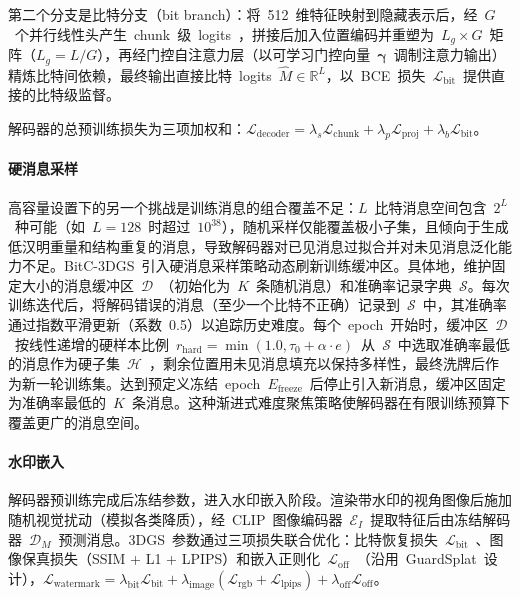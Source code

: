 第二个分支是比特分支（bit branch）：将~512~维特征映射到隐藏表示后，经~$G$~个并行线性头产生~chunk~级~logits~，拼接后加入位置编码并重塑为~$L_g \times G$~矩阵（$L_g = L/G$），再经门控自注意力层（以可学习门控向量~$\bm{\gamma}$~调制注意力输出）精炼比特间依赖，最终输出直接比特~logits~$\hat{M} \in \mathbb{R}^L$，以~BCE~损失~$\mathcal{L}_{\mathrm{bit}}$~提供直接的比特级监督。

解码器的总预训练损失为三项加权和：$\mathcal{L}_{\mathrm{decoder}} = \lambda_s \mathcal{L}_{\mathrm{chunk}} + \lambda_p \mathcal{L}_{\mathrm{proj}} + \lambda_b \mathcal{L}_{\mathrm{bit}}$。

\paragraph{硬消息采样}
高容量设置下的另一个挑战是训练消息的组合覆盖不足：$L$~比特消息空间包含~$2^L$~种可能（如~$L=128$~时超过~$10^{38}$），随机采样仅能覆盖极小子集，且倾向于生成低汉明重量和结构重复的消息，导致解码器对已见消息过拟合并对未见消息泛化能力不足。BitC-3DGS~引入硬消息采样策略动态刷新训练缓冲区。具体地，维护固定大小的消息缓冲区~$\mathcal{D}$~（初始化为~$K$~条随机消息）和准确率记录字典~$\mathcal{S}$。每次训练迭代后，将解码错误的消息（至少一个比特不正确）记录到~$\mathcal{S}$~中，其准确率通过指数平滑更新（系数~0.5）以追踪历史难度。每个~epoch~开始时，缓冲区~$\mathcal{D}$~按线性递增的硬样本比例~$r_{\mathrm{hard}} = \min(1.0, \tau_0 + \alpha \cdot e)$~从~$\mathcal{S}$~中选取准确率最低的消息作为硬子集~$\mathcal{H}$~，剩余位置用未见消息填充以保持多样性，最终洗牌后作为新一轮训练集。达到预定义冻结~epoch~$E_{\mathrm{freeze}}$~后停止引入新消息，缓冲区固定为准确率最低的~$K$~条消息。这种渐进式难度聚焦策略使解码器在有限训练预算下覆盖更广的消息空间。

\paragraph{水印嵌入}
解码器预训练完成后冻结参数，进入水印嵌入阶段。渲染带水印的视角图像后施加随机视觉扰动（模拟各类降质），经~CLIP~图像编码器~$\mathcal{E}_I$~提取特征后由冻结解码器~$\mathcal{D}_M$~预测消息。3DGS~参数通过三项损失联合优化：比特恢复损失~$\mathcal{L}_{\mathrm{bit}}$~、图像保真损失（SSIM + L1 + LPIPS）和嵌入正则化~$\mathcal{L}_{\mathrm{off}}$~（沿用~GuardSplat~设计），$\mathcal{L}_{\mathrm{watermark}} = \lambda_{\mathrm{bit}} \mathcal{L}_{\mathrm{bit}} + \lambda_{\mathrm{image}}(\mathcal{L}_{\mathrm{rgb}} + \mathcal{L}_{\mathrm{lpips}}) + \lambda_{\mathrm{off}} \mathcal{L}_{\mathrm{off}}$。

